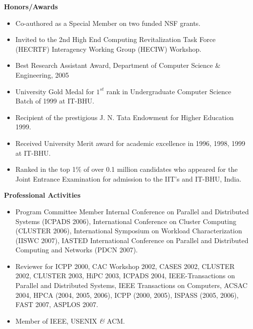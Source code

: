 \documentclass{article}
\begin{document}

\vspace*{-0.1truein}
  \large \textbf{Honors/Awards}
  \small
\vspace*{-0.2truein}
  \begin{center}
  \begin{itemize}
  \item {Co-authored as a Special Member on two funded NSF grants.}
  \item {Invited to the 2nd High End Computing Revitalization Task Force (HECRTF) Interagency Working Group (HECIW)
         Workshop.}
  \item {Best Research Assistant Award, Department of Computer Science \& Engineering, 2005}
  \item {University Gold Medal for $1^{st}$ rank in Undergraduate Computer Science Batch of 1999 at IT-BHU.}
  \item {Recipient of the prestigious J. N. Tata Endowment for Higher Education 1999.} 
  \item {Received University Merit award for academic excellence in 1996, 1998, 1999 at IT-BHU.}
  \item {Ranked in the top 1\% of over 0.1 million candidates who appeared for the Joint Entrance 
  Examination for admission to the IIT's and IT-BHU, India.}
  \end{itemize}
  \end{center}



\vspace*{-0.1truein}
	\large \textbf{Professional Activities}
	\small
\vspace*{-0.2truein}
	\begin{center}
	\begin{itemize}
	\item{Program Committee Member Internal Conference on Parallel and Distributed Systems (ICPADS 2006),
           International Conference on Cluster Computing (CLUSTER 2006), 
           International Symposium on Workload Characterization (IISWC 2007),
           IASTED International Conference on Parallel and Distributed Computing and Networks (PDCN 2007). }
	 \item{Reviewer for ICPP 2000, CAC Workshop 2002, CASES 2002, CLUSTER 2002, CLUSTER 2003, HiPC 2003,
	 ICPADS 2004, IEEE-Transactions on Parallel and Distributed Systems,
	 IEEE Transactions on Computers, ACSAC 2004, HPCA (2004, 2005, 2006), ICPP (2000, 2005),
	 ISPASS (2005, 2006), FAST 2007, ASPLOS 2007.}
	 \item{Member of IEEE, USENIX \emph{\&} ACM.}
	\end{itemize}
	\end{center}

    
\end{document}
